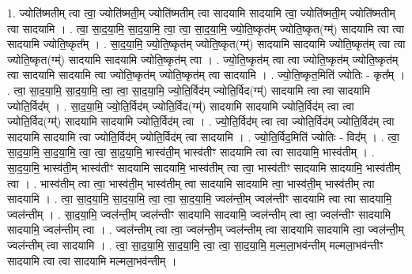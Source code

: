 \documentclass[17pt]{extarticle}
\begin{document}
1. ज्योति॑ष्मतीम् त्वा त्वा॒ ज्योति॑ष्मती॒म् ज्योति॑ष्मतीम् त्वा सादयामि सादयामि त्वा॒ ज्योति॑ष्मती॒म् ज्योति॑ष्मतीम् त्वा सादयामि । . त्वा॒ सा॒द॒या॒मि॒ सा॒द॒या॒मि॒ त्वा॒ त्वा॒ सा॒द॒या॒मि॒ ज्यो॒ति॒ष्कृत॑म् ज्योति॒ष्कृत(ग्म्॑) सादयामि त्वा त्वा सादयामि ज्योति॒ष्कृत᳚म् । . सा॒द॒या॒मि॒ ज्यो॒ति॒ष्कृत॑म् ज्योति॒ष्कृत(ग्म्॑) सादयामि सादयामि ज्योति॒ष्कृत॑म् त्वा त्वा ज्योति॒ष्कृत(ग्म्॑) सादयामि सादयामि ज्योति॒ष्कृत॑म् त्वा । . ज्यो॒ति॒ष्कृत॑म् त्वा त्वा ज्योति॒ष्कृत॑म् ज्योति॒ष्कृत॑म् त्वा सादयामि सादयामि त्वा ज्योति॒ष्कृत॑म् ज्योति॒ष्कृत॑म् त्वा सादयामि । . ज्यो॒ति॒ष्कृत॒मिति॑ ज्योतिः - कृत᳚म् । . त्वा॒ सा॒द॒या॒मि॒ सा॒द॒या॒मि॒ त्वा॒ त्वा॒ सा॒द॒या॒मि॒ ज्यो॒ति॒र्विद॑म् ज्योति॒र्विद(ग्म्॑) सादयामि त्वा त्वा सादयामि ज्योति॒र्विद᳚म् । . सा॒द॒या॒मि॒ ज्यो॒ति॒र्विद॑म् ज्योति॒र्विद(ग्म्॑) सादयामि सादयामि ज्योति॒र्विद॑म् त्वा त्वा ज्योति॒र्विद(ग्म्॑) सादयामि सादयामि ज्योति॒र्विद॑म् त्वा । . ज्यो॒ति॒र्विद॑म् त्वा त्वा ज्योति॒र्विद॑म् ज्योति॒र्विद॑म् त्वा सादयामि सादयामि त्वा ज्योति॒र्विद॑म् ज्योति॒र्विद॑म् त्वा सादयामि । . ज्यो॒ति॒र्विद॒मिति॑ ज्योतिः - विद᳚म् । . त्वा॒ सा॒द॒या॒मि॒ सा॒द॒या॒मि॒ त्वा॒ त्वा॒ सा॒द॒या॒मि॒ भास्व॑ती॒म् भास्व॑तीꣳ सादयामि त्वा त्वा सादयामि॒ भास्व॑तीम् । . सा॒द॒या॒मि॒ भास्व॑ती॒म् भास्व॑तीꣳ सादयामि सादयामि॒ भास्व॑तीम् त्वा त्वा॒ भास्व॑तीꣳ सादयामि सादयामि॒ भास्व॑तीम् त्वा । . भास्व॑तीम् त्वा त्वा॒ भास्व॑ती॒म् भास्व॑तीम् त्वा सादयामि सादयामि त्वा॒ भास्व॑ती॒म् भास्व॑तीम् त्वा सादयामि । . त्वा॒ सा॒द॒या॒मि॒ सा॒द॒या॒मि॒ त्वा॒ त्वा॒ सा॒द॒या॒मि॒ ज्वल॑न्ती॒म् ज्वल॑न्तीꣳ सादयामि त्वा त्वा सादयामि॒ ज्वल॑न्तीम् । . सा॒द॒या॒मि॒ ज्वल॑न्ती॒म् ज्वल॑न्तीꣳ सादयामि सादयामि॒ ज्वल॑न्तीम् त्वा त्वा॒ ज्वल॑न्तीꣳ सादयामि सादयामि॒ ज्वल॑न्तीम् त्वा । . ज्वल॑न्तीम् त्वा त्वा॒ ज्वल॑न्ती॒म् ज्वल॑न्तीम् त्वा सादयामि सादयामि त्वा॒ ज्वल॑न्ती॒म् ज्वल॑न्तीम् त्वा सादयामि । . त्वा॒ सा॒द॒या॒मि॒ सा॒द॒या॒मि॒ त्वा॒ त्वा॒ सा॒द॒या॒मि॒ म॒ल्म॒ला॒भव॑न्तीम् मल्मला॒भव॑न्तीꣳ सादयामि त्वा त्वा सादयामि मल्मला॒भव॑न्तीम् । \newline
\end{document}
